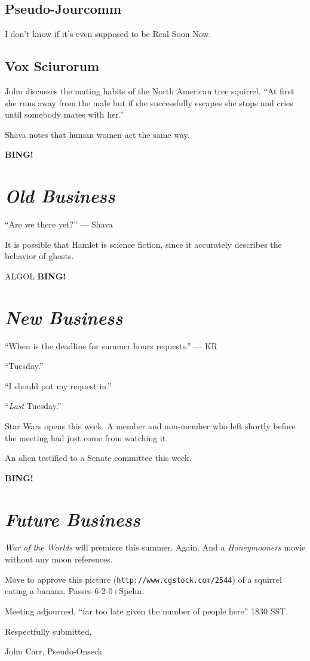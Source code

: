 \documentclass[10pt]{article}
\newcommand{\bing}{{\bf BING!} }
\newcommand{\goto}[1]{\bing \vskip 12pt \section*{{\em{#1}}}}
\begin{document}
\subsection*{Pseudo-Jourcomm}

I don't know if it's even supposed to be Real Soon Now.

\subsection*{Vox Sciurorum}

John discusses the mating habits of the North American tree squirrel.
``At first she runs away from the male but if she successfully
escapes she stops and cries until somebody mates with her.''

Shava notes that human women act the same way.

\goto{Old Business}

``Are we there yet?'' --- Shava

It is possible that Hamlet is science fiction, since it accurately
describes the behavior of ghosts.

ALGOL
\goto{New Business}

``When is the deadline for summer hours requests.'' --- KR

``Tuesday.''

``I should put my request in.''

``{\em Last} Tuesday.''

Star Wars opens this week.  A member and non-member who left shortly
before the meeting had just come from watching it.

An alien testified to a Senate committee this week.

\goto{Future Business}

{\em War of the Worlds} will premiere this summer.  Again.
And a {\em Honeymooners} movie without any moon references.

Move to approve this picture ({\tt http://www.cgstock.com/2544})
of a squirrel eating a banana.
Passes 6-2-0+Spehn.

\vspace{12pt}

\noindent
Meeting adjourned, ``far too late given the number of people here'' 1830 SST.

\vspace{18pt}

\centerline{Respectfully submitted,}
\centerline{John Carr, Pseudo-Onseck}
\end{document}
